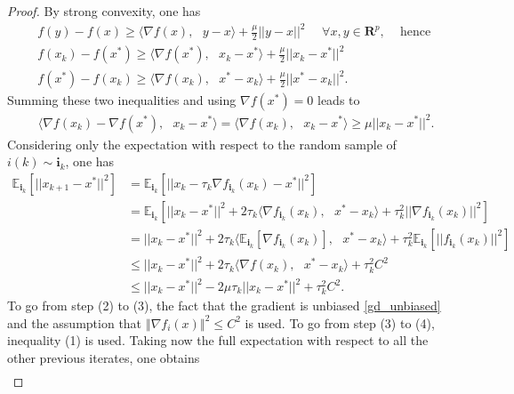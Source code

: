 \begin{proof} By strong convexity, one has
\begin{align}
    &f(y) - f(x) \geq \langle \nabla f(x),\text{ } y-x\rangle + \frac{\mu}{2}||y-x||^{2} \text{ }\text{ } \forall x,y \in \mathbf{R}^{p} \text{,} \text{ } \text{ } \text{hence } \nonumber\\
    &f(x_{k}) - f(x^{*}) \geq \langle \nabla f(x^{*}),\text{ } x_{k}-x^{*}\rangle + \frac{\mu}{2}||x_{k}-x^{*}||^{2}\nonumber\\
    &f(x^{*}) - f(x_{k}) \geq \langle \nabla f(x_{k}),\text{ } x^{*}-x_{k}\rangle + \frac{\mu}{2}||x^{*}-x_{k}||^{2}.\nonumber
\end{align}
Summing these two inequalities and using $\nabla f(x^{*}) = 0$ leads to
\setcounter{equation}{0}
\begin{align}
    &\langle \nabla f(x_{k}) - \nabla f(x^{*}),\text{ } x_{k} - x^{*}\rangle = \langle \nabla f(x_{k}),\text{ } x_{k} - x^{*}\rangle \geq \mu ||x_{k} - x^{*}||^{2}.
\end{align}
Considering only the expectation with respect to the random sample of $i(k) \sim \textbf{i}_{k}$, one has
\begin{align}
\mathbb{E}_{\textbf{i}_{k}}[||x_{k+1}-x^{*}||^{2}]
    &= \mathbb{E}_{\textbf{i}_{k}}[||x_{k} - \tau_{k}\nabla f_{\textbf{i}_{k}}(x_{k}) - x^{*}||^{2}]\nonumber\\
    &= \mathbb{E}_{\textbf{i}_{k}}[||x_{k}-x^{*}||^{2} + 2\tau_{k}\langle\nabla f_{\textbf{i}_{k}}(x_{k}),\text{ } x^{*} - x_{k}\rangle + \tau_{k}^{2}||\nabla f_{\textbf{i}_{k}}(x_{k})||^{2}]\nonumber\\
    &= ||x_{k}-x^{*}||^{2} + 2\tau_{k}\langle \mathbb{E}_{\textbf{i}_{k}}[\nabla f_{\textbf{i}_{k}}(x_{k})], \text{ } x^{*} - x_{k}\rangle + \tau_{k}^{2} \mathbb{E}_{\textbf{i}_{k}}[||f_{\textbf{i}_{k}}(x_{k})||^{2}]\\
    &\leq ||x_{k}-x^{*}||^{2} + 2\tau_{k}\langle \nabla f(x_{k}), \text{ } x^{*} - x_{k}\rangle + \tau_{k}^{2} C^{2}\\
    &\leq ||x_{k}-x^{*}||^{2} - 2\mu \tau_{k} ||x_{k}-x^{*}||^{2} + \tau_{k}^{2} C^{2}.
\end{align}
To go from step (2) to (3), the fact that the gradient is unbiased \ref{gd_unbiased} and the assumption that $\left\Vert\nabla f_{i}(x)\right\Vert^{2} \leq C^{2}$ is used. To go from step (3) to (4), inequality (1) is used. Taking now the full expectation with respect to all the other previous iterates, one obtains
\begin{align} 

\end{align}
\end{proof}
